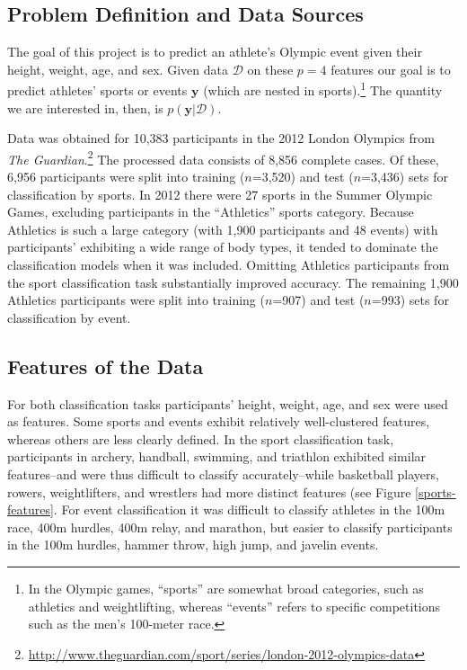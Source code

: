 \documentclass[12pt,letterpaper]{article} %
\begin{document}
\subsection{Problem Definition and Data Sources}

The goal of this project is to predict an athlete's Olympic event given their height, weight, age, and sex. Given data $\mathcal{D}$ on these $p=4$ features our goal is to predict athletes' sports or events $\mathbf{y}$ (which are nested in sports).\footnote{In the Olympic games, ``sports'' are somewhat broad categories, such as athletics and weightlifting, whereas ``events'' refers to specific competitions such as the men's 100-meter race.} The quantity we are interested in, then, is $p(\mathbf{y}|\mathcal{D})$.

Data was obtained for 10,383 participants in the 2012 London Olympics from \textit{The Guardian}.\footnote{\url{http://www.theguardian.com/sport/series/london-2012-olympics-data}} The processed data consists of 8,856 complete cases. Of these, 6,956 participants were split into training ($n$=3,520) and test ($n$=3,436) sets for classification by sports. In 2012 there were 27 sports in the Summer Olympic Games, excluding participants in the ``Athletics'' sports category. Because Athletics is such a large category (with 1,900 participants and 48 events) with participants' exhibiting a wide range of body types, it tended to dominate the classification models when it was included. Omitting Athletics participants from the sport classification task substantially improved accuracy. The remaining 1,900 Athletics participants were split into training ($n$=907) and test ($n$=993) sets for classification by event. 


\subsection{Features of the Data}

For both classification tasks participants' height, weight, age, and sex were used as features. Some sports and events exhibit relatively well-clustered features, whereas others are less clearly defined. In the sport classification task, participants in archery, handball, swimming, and triathlon exhibited similar features--and were thus difficult to classify accurately--while basketball players, rowers, weightlifters, and wrestlers had more distinct features (see Figure \ref{sports-features}. For event classification it was difficult to classify athletes in the 100m race, 400m hurdles, 400m relay, and marathon, but easier to classify participants in the 100m hurdles, hammer throw, high jump, and javelin events. 
\end{document}
